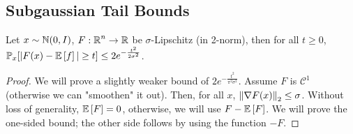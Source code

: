 \subsection{Subgaussian Tail Bounds}
\begin{theorem}
    Let $x \sim \operatorname{\mathbb{N}}(0, I)$, $F: \operatorname{\mathbb{R}}^n \to \operatorname{\mathbb{R}}$ be $\sigma$-Lipschitz (in 2-norm),
    then for all $t \ge 0$, $\mathbb{P}_x[|F(x) - \mathbb{E}\left[ f \right]| \ge t] \le 2e^{-\frac{t^2}{2\sigma^2}}$.

    \begin{proof}
        We will prove a slightly weaker bound of $2e^{-\frac{t^2}{\pi^2 \sigma^2}}$.
        Assume $F$ is $\mathcal{C}^1$ (otherwise we can "smoothen" it out). Then, for all $x$,
        $\norm{\nabla F (x)}_2 \le \sigma$. Without loss of generality, $\mathbb{E}\left[ F \right] = 0$,
        otherwise, we will use $F - \mathbb{E}\left[ F \right]$.
        We will prove the one-sided bound; the other side follows by using the function $-F$.


\end{proof}
\end{theorem}
